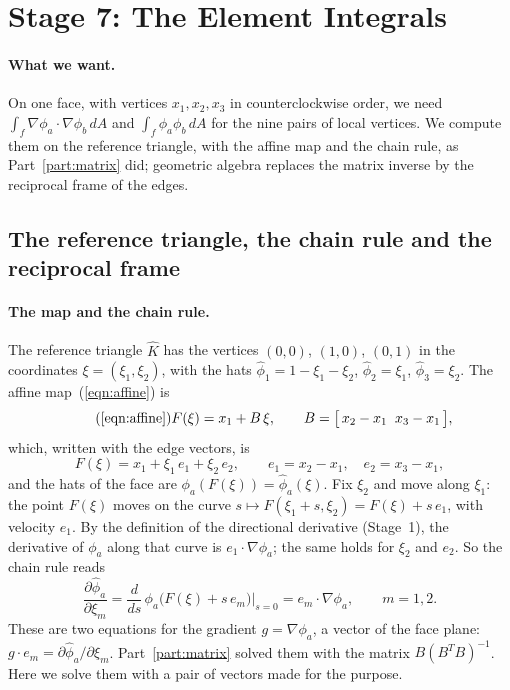 \section{Stage 7: The Element Integrals}
\label{section:r2_stage7}

\paragraph{What we want.} On one face, with vertices $x_1, x_2, x_3$ in counterclockwise order, we need $\int_f \nabla\phi_a\cdot\nabla\phi_b\, dA$ and $\int_f\phi_a\phi_b\, dA$ for the nine pairs of local vertices. We compute them on the reference triangle, with the affine map and the chain rule, as Part~\ref{part:matrix} did; geometric algebra replaces the matrix inverse by the reciprocal frame of the edges.

\subsection{The reference triangle, the chain rule and the reciprocal frame}

\paragraph{The map and the chain rule.} The reference triangle $\hat K$ has the vertices $(0, 0)$, $(1, 0)$, $(0, 1)$ in the coordinates $\xi = (\xi_1, \xi_2)$, with the hats $\hat\phi_1 = 1 - \xi_1 - \xi_2$, $\hat\phi_2 = \xi_1$, $\hat\phi_3 = \xi_2$. The affine map~(\ref{eqn:affine}) is
\begin{equation*}
\tag{\ref{eqn:affine}}
F(\xi) = x_1 + B\, \xi, \qquad B = \big[\, x_2 - x_1 \;\; x_3 - x_1 \,\big] ,
\end{equation*}
which, written with the edge vectors, is
\begin{equation*}
F(\xi) = x_1 + \xi_1\, e_1 + \xi_2\, e_2, \qquad e_1 = x_2 - x_1,\quad e_2 = x_3 - x_1 ,
\end{equation*}
and the hats of the face are $\phi_a(F(\xi)) = \hat\phi_a(\xi)$. Fix $\xi_2$ and move along $\xi_1$: the point $F(\xi)$ moves on the curve $s\mapsto F(\xi_1 + s, \xi_2) = F(\xi) + s\, e_1$, with velocity $e_1$. By the definition of the directional derivative (Stage~1), the derivative of $\phi_a$ along that curve is $e_1\cdot\nabla\phi_a$; the same holds for $\xi_2$ and $e_2$. So the chain rule reads
\begin{equation*}
\frac{\partial\hat\phi_a}{\partial\xi_m} = \frac{d}{ds}\,\phi_a\big(F(\xi) + s\, e_m\big)\Big|_{s = 0} = e_m\cdot\nabla\phi_a , \qquad m = 1, 2 .
\end{equation*}
These are two equations for the gradient $g = \nabla\phi_a$, a vector of the face plane: $g\cdot e_m = \partial\hat\phi_a/\partial\xi_m$. Part~\ref{part:matrix} solved them with the matrix $B(B^TB)^{-1}$. Here we solve them with a pair of vectors made for the purpose.


